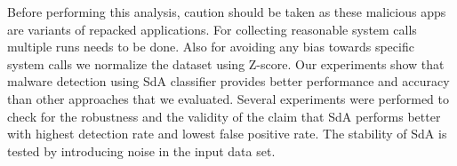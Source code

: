 Before performing this analysis, caution should be taken as these malicious apps are variants of repacked applications. For collecting reasonable system calls multiple runs needs to be done. Also for avoiding any bias towards specific system calls we normalize the dataset using Z-score. Our experiments show that malware detection using SdA classifier provides better performance and accuracy than other approaches that we evaluated. Several experiments were performed to check for the robustness and the validity of the claim that SdA performs better with highest detection rate and lowest false positive rate. The stability of SdA is tested by introducing noise in the input data set.